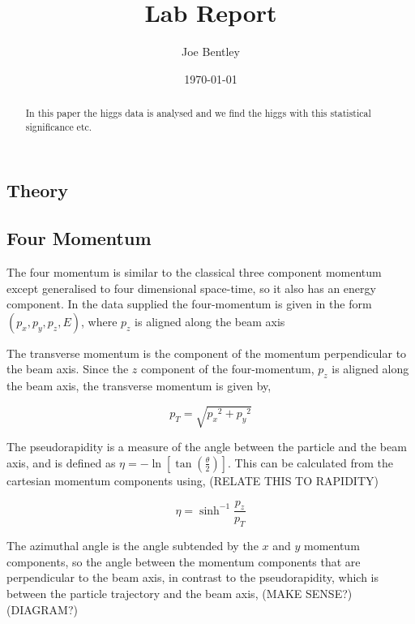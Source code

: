 \documentclass[11pt]{amsart}
\title{Lab Report}
\author{Joe Bentley}
\date{\today}
\begin{document}
\begin{abstract}
  In this paper the higgs data is analysed and we find the higgs with this statistical significance etc.
\end{abstract}

\maketitle

\newpage

\pagestyle{fancyplain}


\begin{multicols}{2}

\section{Theory}

\subsection{Four Momentum}
\label{sec:fourmomentum}

The four momentum is similar to the classical three component momentum except generalised to four dimensional space-time, so it also has an energy component. \cite{kinematics} In the data supplied the four-momentum is given in the form $(p_x, p_y, p_z, E)$, where $p_z$ is aligned along the beam axis

The transverse momentum is the component of the momentum perpendicular to the beam axis. Since the $z$ component of the four-momentum, $p_z$ is aligned along the beam axis, the transverse momentum is given by,

\begin{equation}
  \label{eq:transverse}
  p_T = \sqrt{{p_x}^2 + {p_y}^2}
\end{equation}

The pseudorapidity is a measure of the angle between the particle and the beam axis, and is defined as $\eta = -\ln{\left[\tan{\left(\frac{\theta}{2}\right)}\right]}$. This can be calculated from the cartesian momentum components using, (RELATE THIS TO RAPIDITY)

\begin{equation}
  \label{eq:pseudorapidity}
  \eta = \sinh^{-1} \frac{p_z}{p_T}
\end{equation}

The azimuthal angle is the angle subtended by the $x$ and $y$ momentum components, so the angle between the momentum components that are perpendicular to the beam axis, in contrast to the pseudorapidity, which is between the particle trajectory and the beam axis, (MAKE SENSE?) (DIAGRAM?)


\end{multicols}
\end{document}
